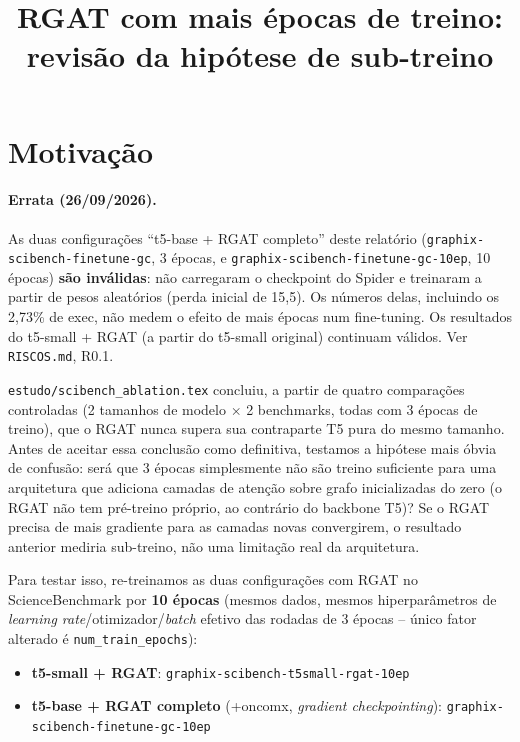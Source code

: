 \documentclass{article}
\title{RGAT com mais épocas de treino: revisão da hipótese de sub-treino}
\author{}
\date{}
\begin{document}
\maketitle

\section{Motivação}

\paragraph{Errata (26/09/2026).} As duas configurações ``t5-base + RGAT
completo'' deste relatório (\texttt{graphix-scibench-finetune-gc}, 3 épocas, e
\texttt{graphix-scibench-finetune-gc-10ep}, 10 épocas) \textbf{são
inválidas}: não carregaram o checkpoint do Spider e treinaram a partir de
pesos aleatórios (perda inicial de 15,5). Os números delas, incluindo os
2,73\% de exec, não medem o efeito de mais épocas num fine-tuning. Os
resultados do t5-small + RGAT (a partir do t5-small original) continuam
válidos. Ver \texttt{RISCOS.md}, R0.1.


\texttt{estudo/scibench\_ablation.tex} concluiu, a partir de quatro
comparações controladas (2 tamanhos de modelo $\times$ 2 benchmarks,
todas com 3 épocas de treino), que o RGAT nunca supera sua contraparte
T5 pura do mesmo tamanho. Antes de aceitar essa conclusão como
definitiva, testamos a hipótese mais óbvia de confusão: será que 3
épocas simplesmente não são treino suficiente para uma arquitetura que
adiciona camadas de atenção sobre grafo inicializadas do zero (o RGAT
não tem pré-treino próprio, ao contrário do backbone T5)? Se o RGAT
precisa de mais gradiente para as camadas novas convergirem, o
resultado anterior mediria sub-treino, não uma limitação real da
arquitetura.

Para testar isso, re-treinamos as duas configurações com RGAT no
ScienceBenchmark por \textbf{10 épocas} (mesmos dados, mesmos
hiperparâmetros de \emph{learning rate}/otimizador/\emph{batch}
efetivo das rodadas de 3 épocas -- único fator alterado é
\texttt{num\_train\_epochs}):

\begin{itemize}
\item \textbf{t5-small + RGAT}: \texttt{graphix-scibench-t5small-rgat-10ep}
\item \textbf{t5-base + RGAT completo} (+oncomx, \emph{gradient checkpointing}):
      \texttt{graphix-scibench-finetune-gc-10ep}
\end{itemize}
\end{document}
